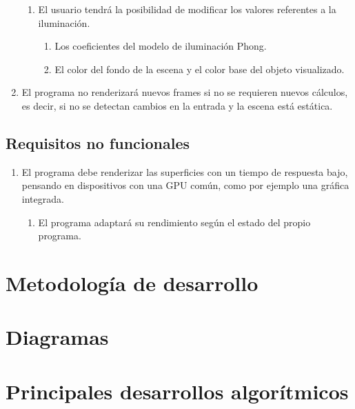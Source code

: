 \begin{enumerate}
\begin{enumerate}
			\item El usuario tendrá la posibilidad de modificar los valores referentes a la iluminación.
			\begin{enumerate}
				\item Los coeficientes del modelo de iluminación Phong.
				\item El color del fondo de la escena y el color base del objeto visualizado.
			\end{enumerate}
		\end{enumerate}
			
		\item El programa no renderizará nuevos frames si no se requieren nuevos cálculos, es decir, si no se detectan cambios en la entrada y la escena está estática.
	\end{enumerate}

	\subsection{Requisitos no funcionales}
	\begin{enumerate}
		\item El programa debe renderizar las superficies con un tiempo de respuesta bajo, pensando en dispositivos con una GPU común, como por ejemplo una gráfica integrada.
		\begin{enumerate}
			\item El programa adaptará su rendimiento según el estado del propio programa.
		\end{enumerate}
	\end{enumerate}

\section{Metodología de desarrollo}

\section{Diagramas}

\section{Principales desarrollos algorítmicos}

\endinput

